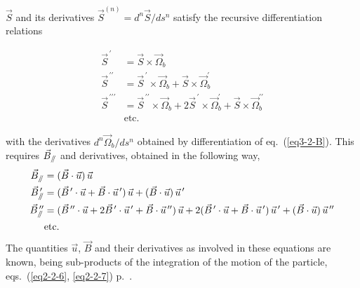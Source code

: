 \noindent $\vec S$ and its derivatives $ \vec  S^{(n)} = d^n\vec  S / ds^n $ 
satisfy the  recursive differentiation relations

 \begin{equation}
	 \begin{aligned}
               \vec   S^{\,\prime}  & = \vec  S \times  \vec  \Omega_b \\
		\vec  S^{\,\prime\prime} 
		      &  =\vec  S^{\,\prime} \times\vec  \Omega_b +\vec  S\times\vec  \Omega_b ^\prime \\
		\vec  S^{\,\prime\prime\prime}
		      &  =\vec  S^{\,\prime\prime} \times\vec  \Omega_b +2\vec  S^{\,\prime} \times\vec  \Omega_b ^\prime 
		           +\vec S\times\vec  \Omega_b^{\prime\prime} \\
                 &  \textrm{etc.}
	 \end{aligned}
 	\label{eq3-6-S}
 \end{equation}
 
 \noindent  with the derivatives $ d^n \vec  \Omega_b / ds^n $  obtained by differentiation of  eq.~(\ref{eq3-2-B}). 
 This requires   $ \vec  B_{\mathrel{/\kern-.25em/}} $ and  derivatives, obtained in the following way, 
\begin{equation}
	\begin{aligned}
		\vec  B_{\mathrel{/\kern-.25em/}} 
		     & = (\vec  B \cdot\vec  u)\, \vec  u \\
		\vec  B^{\,\prime}_{\mathrel{/\kern-.25em/}}  
		     & = (\vec B^{\,\prime} \cdot\vec  u+\vec  B\cdot\vec  u^{\,\prime} )\,\vec  u
		       +(\vec  B\cdot\vec  u)\,\vec u^{\,\prime} \\
		\vec B^{\,\prime\prime}_{\mathrel{/\kern-.25em/}}  
		     & = (\vec  B^{\,\prime\prime} \cdot\vec  u+2\vec B^{\,\prime} \cdot\vec  u^{\,\prime} 
		       +\vec  B\cdot\vec  u^{\,\prime\prime} )\, \vec  u
		       +2(\vec B^{\,\prime} \cdot\vec  u+\vec  B\cdot\vec  u^{\,\prime} )\,\vec  u^{\,\prime} 
		       +(\vec  B\cdot\vec u)\,\vec  u^{\,\prime\prime}\\
		&\text{\textrm{etc.}}
	\end{aligned}
	\label{eq3-7-S}
\end{equation}
\noindent The quantities $ \vec  u$,  $ \vec  B $ and their  derivatives
as involved in these equations are known, being sub-products of the integration of the  motion of the 
particle, eqs.~(\ref{eq2-2-6}, \ref{eq2-2-7}) p.~\pageref{eq2-2-6}.




